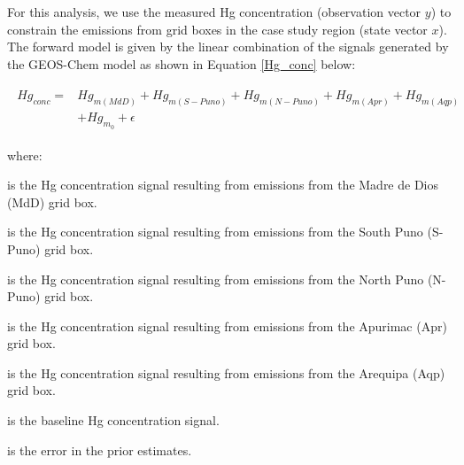 \begin{flushleft}
For this analysis, we use the measured Hg concentration (observation vector $y$) to constrain the  emissions from grid boxes in the case study region (state vector $x$). The forward model is given by the linear combination of the signals generated by the GEOS-Chem model as shown in Equation \ref{Hg_conc} below:

\begin{align}
\begin{split}\label{Hg_conc}
Hg_{conc}= {}&Hg_{m(MdD)}+ Hg_{m(S-Puno)} + Hg_{m(N-Puno)} + Hg_{m(Apr)}+ Hg_{m(Aqp)}\\
            & +Hg_{m_0} + \epsilon
\end{split}
\end{align}

where:
\end{flushleft}

\begin{description}[leftmargin=!,labelwidth={5 em}]
    \item [$Hg_{m(MdD)}$] is the Hg concentration signal resulting from emissions from the Madre de Dios (MdD) grid box.
    \item [$Hg_{m(S-Puno)}$] is the Hg concentration signal resulting from emissions from the South Puno (S-Puno) grid box.
    \item [$Hg_{m(N-Puno)}$] is the Hg concentration signal resulting from emissions from the North Puno (N-Puno) grid box.
    \item [$Hg_{m(Apr)}$] is the Hg concentration signal resulting from emissions from the Apurimac (Apr) grid box.
    \item [$Hg_{m(Aqp)}$] is the Hg concentration signal resulting from emissions from the Arequipa (Aqp) grid box.
    \item [$Hg_{m_0}$] is the baseline Hg concentration signal.
    \item [$\epsilon$] is the error in the prior estimates.
\end{description}

